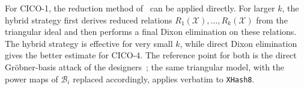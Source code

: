 For CICO-1, the reduction method of~\cite{DBLP:conf/crypto/BariantBBHOR25} can be applied directly. For larger $k$, the hybrid strategy first derives reduced relations $R_1(\mathcal{X}),\ldots,R_k(\mathcal{X})$ from the triangular ideal and then performs a final Dixon elimination on these relations. The hybrid strategy is effective for very small $k$, while direct Dixon elimination gives the better estimate for CICO-4. The reference point for both is the direct Gr\"obner-basis attack of the designers~\cite{DBLP:journals/iacr/AshurKM23}; the same triangular model, with the power maps of $\mathcal{B}_i$ replaced accordingly, applies verbatim to \texttt{XHash8}.
